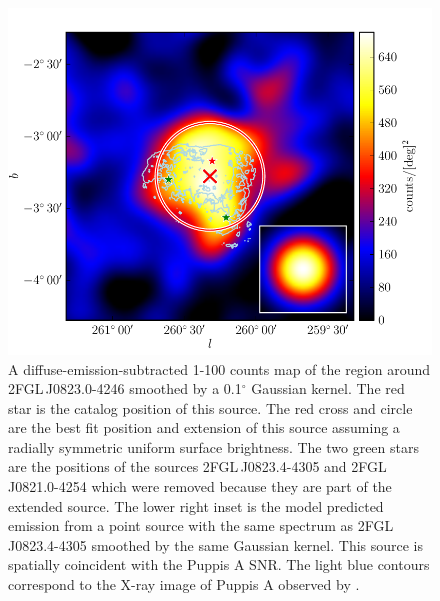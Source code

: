 \documentclass[12pt,preprint]{aastex}
\newcommand{\gev}{\text{GeV}\xspace}
\newcommand{\rosat}{\text{{\em ROSAT}}\xspace}
\renewcommand{\deg}{\ensuremath{^\circ}\xspace}
\begin{document}
\begin{figure}
  \begin{center}
    \includegraphics[type=pdf,ext=.pdf,read=.pdf]{source_plots/source_1FGL_J0823.3-4248}
  \end{center}
  \caption{A diffuse-emission-subtracted 1-100
  \gev counts map of the region around 2FGL\,J0823.0-4246 smoothed
  by a 0.1\deg Gaussian kernel.  The red star is the catalog position
  of this source.  The red cross and circle are the best fit position
  and extension of this source assuming a radially symmetric uniform
  surface brightness.  The two green stars are the positions of the
  sources 2FGL\,J0823.4-4305 and 2FGL\,J0821.0-4254 which were removed
  because they are part of the extended source.  The lower right inset
  is the model predicted emission from a point source with the same
  spectrum as 2FGL\,J0823.4-4305 smoothed by the same Gaussian kernel.
  This source is spatially coincident with the Puppis A SNR. The
  light blue contours correspond to the X-ray image of Puppis A observed by 
  \rosat
  \citep{rosat_puppis_a}. 
  }\label{1FGL_J0823.3-4248}
\end{figure}
\end{document}
